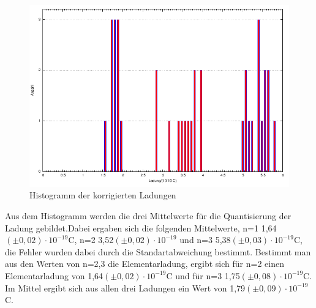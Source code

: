 \documentclass[12pt]{scrartcl}
\begin{document}
\begin{figure}[H] 
  \centering
    \includegraphics[scale = 0.7]{messung.pdf}
  	\caption[Histogramm der korrigierten Ladungen]{Histogramm der korrigierten Ladungen}
  \label{fig:histogramm}
\end{figure}

Aus dem Histogramm werden die drei Mittelwerte für die Quantisierung der Ladung gebildet.Dabei ergaben sich die folgenden Mittelwerte, n=1 \hspace*{4px} 1,64$(\pm0,02)\cdot 10^{-19}$C, n=2 \hspace*{4px} 3,52$(\pm 0,02)\cdot 10^{-19}$ und n=3 \hspace*{4px} 5,38$(\pm 0,03)\cdot 10^{-19}$C, die Fehler wurden dabei durch die Standartabweichung bestimmt. Bestimmt man aus den Werten von n=2,3 die Elementarladung, ergibt sich für n=2 einen Elementarladung von 1,64$(\pm 0,02)\cdot 10^{-19}$C und für n=3 \hspace*{4px} 1,75$(\pm 0,08)\cdot 10^{-19}$C.
Im Mittel ergibt sich aus allen drei Ladungen ein Wert von 1,79$(\pm 0,09)\cdot 10^{-19}$C.
\end{document}
